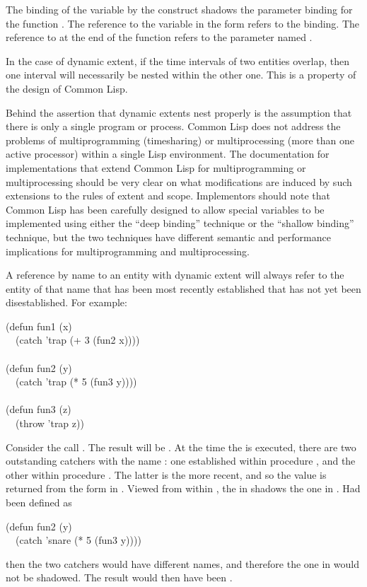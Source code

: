 The binding of the variable  by the  construct shadows
the parameter binding for the function .  The reference to the
variable  in the  form refers to the  binding.
The reference to  at the end of the function refers to the parameter
named .

In the case of dynamic extent, if the time intervals of two entities
overlap, then one interval will necessarily be nested within the
other one.  This is a property of the design of Common Lisp.

\beforenoterule
\begin{implementation}
Behind the assertion that dynamic extents nest properly
is the assumption that there is only a single program or process.
Common Lisp does not address the problems of multiprogramming
(timesharing) or
multiprocessing (more than one active processor)
within a single Lisp environment.  The documentation for
implementations that extend Common Lisp for multiprogramming or
multiprocessing should
be very clear on what modifications are induced by such extensions
to the rules of extent and scope.
Implementors should note that Common Lisp has been carefully designed
to allow special variables to be implemented using either
the ``deep binding'' technique or the ``shallow binding'' technique,
but the two techniques have different semantic
and performance implications for multiprogramming and multiprocessing.
\end{implementation}
\afternoterule

A reference by name to an entity with dynamic extent
will always refer to the entity of that name
that has been most recently established
that has not yet been disestablished.
For example:
\begin{lisp}
(defun fun1 (x) \\
~~(catch 'trap (+ 3 (fun2 x)))) \\
 \\
(defun fun2 (y) \\
~~(catch 'trap (* 5 (fun3 y)))) \\
 \\
(defun fun3 (z) \\
~~(throw 'trap z))
\end{lisp}
Consider the call .  The result will be .  At the time
the  is executed, there are two outstanding catchers with the
name : one established within procedure , and the other
within procedure .  The latter is the more recent, and so the
value  is returned from the  form in .
Viewed from within , the  in  shadows the one in .
Had 
been defined as
\begin{lisp}
(defun fun2 (y) \\
~~(catch 'snare (* 5 (fun3 y))))
\end{lisp}
then the two catchers would have different names, and therefore the one
in  would not be shadowed.  The result would then have been .

